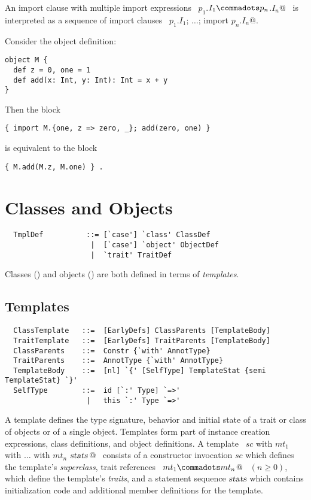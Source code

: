 An import clause with multiple import expressions
~\lstinline@import $p_1$.$I_1 \commadots p_n$.$I_n$@~ is interpreted as a
sequence of import clauses 
~\lstinline@import $p_1$.$I_1$; $\ldots$; import $p_n$.$I_n$@.

\example Consider the object definition:
\begin{lstlisting}
object M { 
  def z = 0, one = 1  
  def add(x: Int, y: Int): Int = x + y 
}
\end{lstlisting}
Then the block
\begin{lstlisting}
{ import M.{one, z => zero, _}; add(zero, one) }
\end{lstlisting}
is equivalent to the block 
\begin{lstlisting}
{ M.add(M.z, M.one) } .
\end{lstlisting}

\chapter{Classes and Objects}
\label{sec:globaldefs}

\syntax\begin{lstlisting}
  TmplDef          ::= [`case'] `class' ClassDef
                    |  [`case'] `object' ObjectDef
                    |  `trait' TraitDef
\end{lstlisting}

Classes () and objects
() are both defined in terms of {\em templates}.

\section{Templates}
\label{sec:templates}

\syntax\begin{lstlisting}
  ClassTemplate   ::=  [EarlyDefs] ClassParents [TemplateBody]
  TraitTemplate   ::=  [EarlyDefs] TraitParents [TemplateBody]
  ClassParents    ::=  Constr {`with' AnnotType}
  TraitParents    ::=  AnnotType {`with' AnnotType}
  TemplateBody    ::=  [nl] `{' [SelfType] TemplateStat {semi TemplateStat} `}'
  SelfType        ::=  id [`:' Type] `=>'
                   |   this `:' Type `=>' 
\end{lstlisting}

A template defines the type signature, behavior and initial state of a
trait or class of objects or of a single object. Templates form part of
instance creation expressions, class definitions, and object
definitions.  A template 
~\lstinline@$sc$ with $mt_1$ with $\ldots$ with $mt_n$ {$\mbox{\sl stats}\,$}@~ 
consists of a constructor invocation $sc$
which defines the template's {\em superclass}, trait references
~\lstinline@$mt_1 \commadots mt_n$@~ $(n \geq 0)$, which define the
template's {\em traits}, and a statement sequence $\mbox{\sl stats}$ which
contains initialization code and additional member definitions for the
template.

